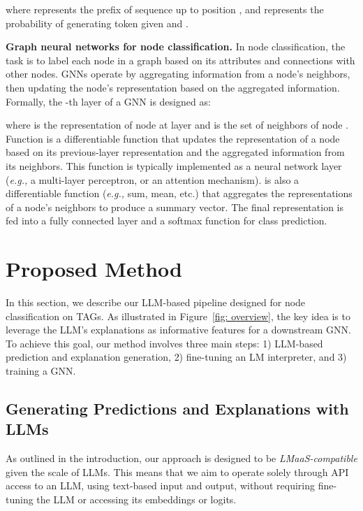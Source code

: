 \documentclass{article}
\newcommand{\eg}{\emph{e.g.,}\xspace}
\begin{document}
where  represents the prefix of sequence  up to position , and  represents the probability of generating token  given  and . 



\textbf{Graph neural networks for node classification.}
In node classification, the task is to label each node in a graph based on its attributes and connections with other nodes. GNNs operate by aggregating information from a node's neighbors, then updating the node's representation based on the aggregated information. Formally, the -th layer of a GNN is designed as:

where  is the representation of node  at layer  and  is the set of neighbors of node . Function  is a differentiable function that updates the representation of a node based on its previous-layer representation and the aggregated information from its neighbors. This function is typically implemented as a neural network layer (\eg a multi-layer perceptron, or an attention mechanism).  is also a differentiable function (\eg sum, mean, etc.) that aggregates the representations of a node's neighbors to produce a summary vector. The final representation is fed into a fully connected layer and a softmax function for class prediction.





\section{Proposed Method}
In this section, we describe our LLM-based pipeline designed for node classification on TAGs. As illustrated in Figure~\ref{fig: overview}, the key idea
is to leverage the LLM's explanations as informative features for a downstream GNN. To achieve this goal, our method involves three main steps: 1) LLM-based prediction and explanation generation, 2) fine-tuning an LM interpreter, and 3) training a GNN.


\subsection{Generating Predictions and Explanations with LLMs}
As outlined in the introduction, our approach is designed to be \emph{LMaaS-compatible} given the scale of LLMs. This means that we aim to operate solely through API access to an LLM, using text-based input and output, without requiring fine-tuning the LLM or accessing its embeddings or logits.
\end{document}
